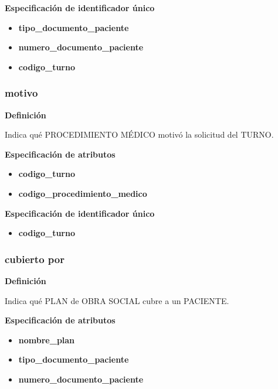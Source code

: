 \documentclass[a4paper,11pt]{article}
\begin{document}
\textbf{Especificación de identificador único}

\begin{itemize}

     \item \textbf{tipo\_documento\_paciente}

     \item \textbf{numero\_documento\_paciente}

     \item \textbf{codigo\_turno}

\end{itemize}



\subsubsection{\textbf{motivo}}

\textbf{Definición}

Indica qué PROCEDIMIENTO MÉDICO motivó la solicitud del TURNO.

\textbf{Especificación de atributos}


\begin{itemize}
     	\item \textbf{codigo\_turno}
	\item \textbf{codigo\_procedimiento\_medico}

\end{itemize}

\textbf{Especificación de identificador único}

\begin{itemize}

     \item \textbf{codigo\_turno}

\end{itemize}

\subsubsection{\textbf{cubierto por}}

\textbf{Definición}

Indica qué PLAN de OBRA SOCIAL cubre a un PACIENTE.

\textbf{Especificación de atributos}

\begin{itemize}
	\item \textbf{nombre\_plan}
	
	\item \textbf{tipo\_documento\_paciente}

     \item \textbf{numero\_documento\_paciente}
\end{itemize}
\end{document}
